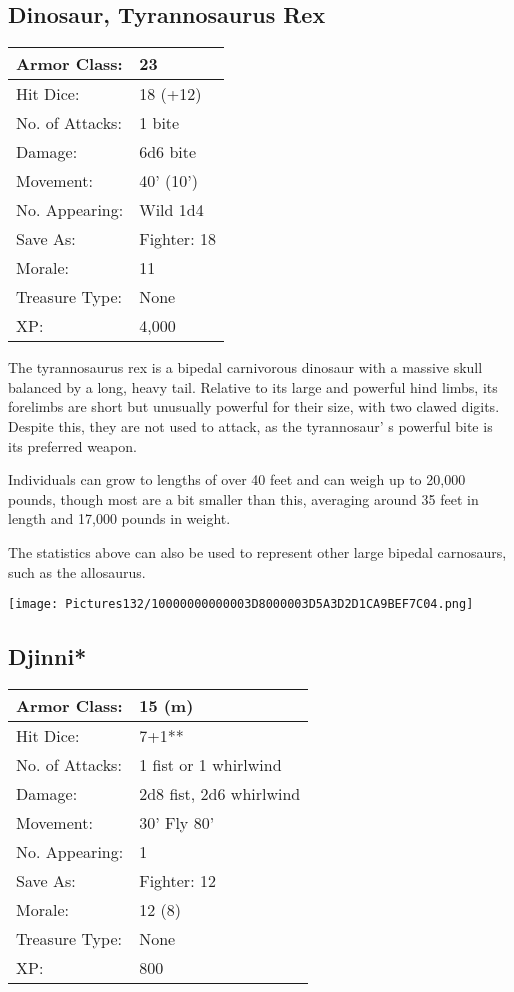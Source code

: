 \documentclass[a4paper,twoside,openany,10pt]{book}
\begin{document}
\begin{multicols}{2}
\subsection*{Dinosaur, Tyrannosaurus Rex}\label{dinosaur-tyrannosaurus-rex}


\begin{tabularx}{0.48\textwidth}{@{}lX@{}}
Armor Class: & 23 \\\hline
Hit Dice: & 18 (+12) \\\hline
No. of Attacks: & 1 bite \\\hline
Damage: & 6d6 bite \\\hline
Movement: & 40' (10') \\\hline
No. Appearing: & Wild 1d4 \\\hline
Save As: & Fighter: 18 \\\hline
Morale: & 11 \\\hline
Treasure Type: & None \\\hline
XP: & 4,000 \\\hline
\end{tabularx}\medskip

The tyrannosaurus rex is a bipedal carnivorous dinosaur with a massive skull balanced by a long, heavy tail. Relative to its large and powerful hind limbs, its forelimbs are short but unusually powerful for their size, with two clawed digits. Despite this, they are not used to attack, as the tyrannosaur' s powerful bite is its preferred weapon.

Individuals can grow to lengths of over 40 feet and can weigh up to 20,000 pounds, though most are a bit smaller than this, averaging around 35 feet in length and 17,000 pounds in weight.

The statistics above can also be used to represent other large bipedal carnosaurs, such as the allosaurus.

\begin{center}
	\texttt{[image: Pictures132/10000000000003D8000003D5A3D2D1CA9BEF7C04.png]}
\end{center}

\subsection*{Djinni*}\label{djinni}


\begin{tabularx}{0.48\textwidth}{@{}lX@{}}
Armor Class: & 15 (m) \\\hline
Hit Dice: & 7+1** \\\hline
No. of Attacks: & 1 fist or 1 whirlwind \\\hline
Damage: & 2d8 fist, 2d6 whirlwind \\\hline
Movement: & 30' Fly 80' \\\hline
No. Appearing: & 1 \\\hline
Save As: & Fighter: 12 \\\hline
Morale: & 12 (8) \\\hline
Treasure Type: & None \\\hline
XP: & 800 \\\hline
\end{tabularx}\medskip


\end{multicols}
\end{document}
